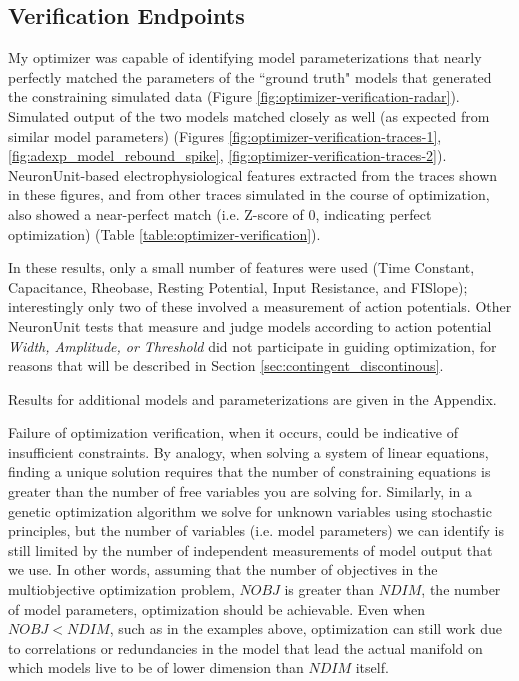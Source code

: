 \subsection{Verification Endpoints}
My optimizer was capable of identifying model parameterizations that nearly perfectly matched the parameters of the ``ground truth" models that generated the constraining simulated data (Figure \ref{fig:optimizer-verification-radar}).
Simulated output of the two models matched closely as well (as expected from similar model parameters) (Figures \ref{fig:optimizer-verification-traces-1}, \ref{fig:adexp_model_rebound_spike}, \ref{fig:optimizer-verification-traces-2}).
NeuronUnit-based electrophysiological features extracted from the traces shown in these figures, and from other traces simulated in the course of optimization, also showed a near-perfect match (i.e. Z-score of 0, indicating perfect optimization) (Table \ref{table:optimizer-verification}).

In these results, only a small number of features were used (Time Constant, Capacitance, Rheobase, Resting Potential, Input Resistance, and FISlope); interestingly only two of these involved a measurement of action potentials.
Other NeuronUnit tests that measure and judge models according to action potential \emph{Width, Amplitude, or Threshold} did not participate in guiding optimization, for reasons that will be described in Section \ref{sec:contingent_discontinous}.


Results for additional models and parameterizations are given in the Appendix.

Failure of optimization verification, when it occurs, could be indicative of insufficient constraints.
By analogy, when solving a system of linear equations, finding a unique solution requires that the number of constraining equations is greater than the number of free variables you are solving for.
Similarly, in a genetic optimization algorithm we solve for unknown variables using stochastic principles, but the number of variables (i.e. model parameters) we can identify is still limited by the number of independent measurements of model output that we use.
In other words, assuming that the number of objectives in the multiobjective optimization problem, $NOBJ$ is greater than $NDIM$, the number of model parameters, optimization should be achievable.
Even when $NOBJ<NDIM$, such as in the examples above, optimization can still work due to correlations or redundancies in the model that lead the actual manifold on which models live to be of lower dimension than $NDIM$ itself.

